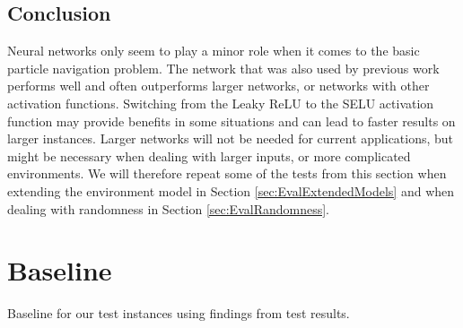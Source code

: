 \subsection{Conclusion} \label{sec:Eval/Networks/Conclusion}
Neural networks only seem to play a minor role when it comes to the basic particle navigation problem. The network that was also used by previous work performs well and often outperforms larger networks, or networks with other activation functions. Switching from the Leaky ReLU to the SELU activation function may provide benefits in some situations and can lead to faster results on larger instances. Larger networks will not be needed for current applications, but might be necessary when dealing with larger inputs, or more complicated environments. We will therefore repeat some of the tests from this section when extending the environment model in Section \ref{sec:EvalExtendedModels} and when dealing with randomness in Section \ref{sec:EvalRandomness}. 

\section{Baseline} \label{sec:EvalBaseline}
Baseline for our test instances using findings from test results.


